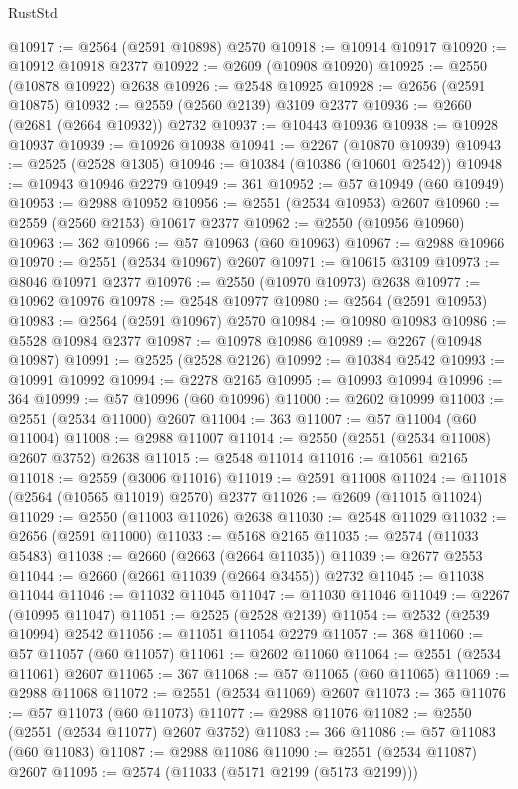\begin{lexlean}{RustStd}
\begin{coremodule}
@10917 := @2564 (@2591 @10898) @2570
@10918 := @10914 @10917
@10920 := @10912 @10918 @2377
@10922 := @2609 (@10908 @10920)
@10925 := @2550 (@10878 @10922) @2638
@10926 := @2548 @10925
@10928 := @2656 (@2591 @10875)
@10932 := @2559 (@2560 @2139) @3109 @2377
@10936 := @2660 (@2681 (@2664 @10932)) @2732
@10937 := @10443 @10936
@10938 := @10928 @10937
@10939 := @10926 @10938
@10941 := @2267 (@10870 @10939)
@10943 := @2525 (@2528 @1305)
@10946 := @10384 (@10386 (@10601 @2542))
@10948 := @10943 @10946 @2279
@10949 := 361
@10952 := @57 @10949 (@60 @10949)
@10953 := @2988 @10952
@10956 := @2551 (@2534 @10953) @2607
@10960 := @2559 (@2560 @2153) @10617 @2377
@10962 := @2550 (@10956 @10960)
@10963 := 362
@10966 := @57 @10963 (@60 @10963)
@10967 := @2988 @10966
@10970 := @2551 (@2534 @10967) @2607
@10971 := @10615 @3109
@10973 := @8046 @10971 @2377
@10976 := @2550 (@10970 @10973) @2638
@10977 := @10962 @10976
@10978 := @2548 @10977
@10980 := @2564 (@2591 @10953)
@10983 := @2564 (@2591 @10967) @2570
@10984 := @10980 @10983
@10986 := @5528 @10984 @2377
@10987 := @10978 @10986
@10989 := @2267 (@10948 @10987)
@10991 := @2525 (@2528 @2126)
@10992 := @10384 @2542
@10993 := @10991 @10992
@10994 := @2278 @2165
@10995 := @10993 @10994
@10996 := 364
@10999 := @57 @10996 (@60 @10996)
@11000 := @2602 @10999
@11003 := @2551 (@2534 @11000) @2607
@11004 := 363
@11007 := @57 @11004 (@60 @11004)
@11008 := @2988 @11007
@11014 := @2550 (@2551 (@2534 @11008) @2607 @3752) @2638
@11015 := @2548 @11014
@11016 := @10561 @2165
@11018 := @2559 (@3006 @11016)
@11019 := @2591 @11008
@11024 := @11018 (@2564 (@10565 @11019) @2570) @2377
@11026 := @2609 (@11015 @11024)
@11029 := @2550 (@11003 @11026) @2638
@11030 := @2548 @11029
@11032 := @2656 (@2591 @11000)
@11033 := @5168 @2165
@11035 := @2574 (@11033 @5483)
@11038 := @2660 (@2663 (@2664 @11035))
@11039 := @2677 @2553
@11044 := @2660 (@2661 @11039 (@2664 @3455)) @2732
@11045 := @11038 @11044
@11046 := @11032 @11045
@11047 := @11030 @11046
@11049 := @2267 (@10995 @11047)
@11051 := @2525 (@2528 @2139)
@11054 := @2532 (@2539 @10994) @2542
@11056 := @11051 @11054 @2279
@11057 := 368
@11060 := @57 @11057 (@60 @11057)
@11061 := @2602 @11060
@11064 := @2551 (@2534 @11061) @2607
@11065 := 367
@11068 := @57 @11065 (@60 @11065)
@11069 := @2988 @11068
@11072 := @2551 (@2534 @11069) @2607
@11073 := 365
@11076 := @57 @11073 (@60 @11073)
@11077 := @2988 @11076
@11082 := @2550 (@2551 (@2534 @11077) @2607 @3752)
@11083 := 366
@11086 := @57 @11083 (@60 @11083)
@11087 := @2988 @11086
@11090 := @2551 (@2534 @11087) @2607
@11095 := @2574 (@11033 (@5171 @2199 (@5173 @2199)))

\end{coremodule}
\end{lexlean}
